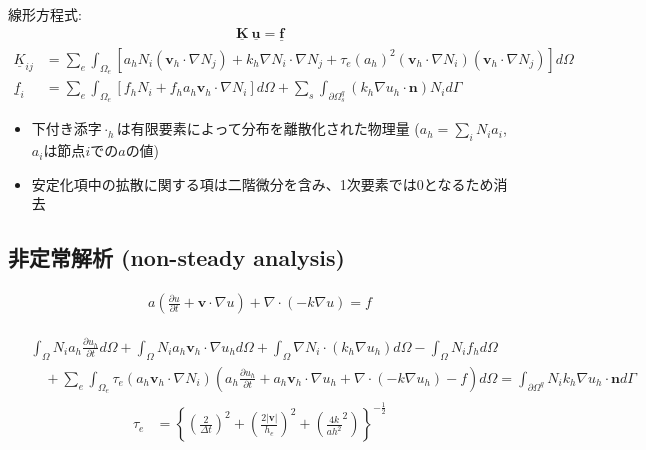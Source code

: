 \documentclass[8pt,a4paper]{article}
\newcommand{\pcl}{\partial}
\newcommand{\bsm}{\boldsymbol}
\newcommand{\udl}{\underline}
\begin{document}
\noindent
線形方程式:
\begin{align}
	\udl{\bsm{K}} \ \udl{\bsm{u}} = \udl{\bsm{f}}
\end{align}
\begin{align}
	\udl{K}_{ij} &= \sum_e \int_{\Omega_e} \left[ a_h N_i \left( \bsm{v}_h \cdot \nabla N_j \right) + k_h \nabla N_i \cdot \nabla N_j + \tau_e (a_h)^2 \left( \bsm{v}_h \cdot \nabla N_i \right) \left( \bsm{v}_h \cdot \nabla N_j \right) \right] d\Omega \\
	\udl{f}_i    &= \sum_e \int_{\Omega_e} \left[ f_h N_i + f_h a_h \bsm{v}_h \cdot \nabla N_i \right] d\Omega + \sum_s \int_{\pcl \Omega^q_s} \left( k_h \nabla u_h  \cdot \bsm{n} \right) N_i d\Gamma 
\end{align}
\begin{itemize}
	\item 下付き添字$\cdot_h$は有限要素によって分布を離散化された物理量 ($a_h = \sum_i N_i a_i$, $a_i$は節点$i$での$a$の値)
	\item 安定化項中の拡散に関する項は二階微分を含み、1次要素では$0$となるため消去
\end{itemize}

\subsection*{非定常解析 (non-steady analysis)}
\begin{align}
	a \left( \frac{\pcl u}{\pcl t} + \bsm{v} \cdot \nabla u \right) + \nabla \cdot \left( -k \nabla u \right) = f
\end{align}

\begin{align}
	\begin{split}
		&\int_{\Omega} N_i a_h \frac{\pcl u_h}{\pcl t} d\Omega + \int_{\Omega} N_i a_h \bsm{v}_h \cdot \nabla u_h d\Omega + \int_{\Omega} \nabla N_i \cdot \left( k_h \nabla u_h \right) d\Omega - \int_{\Omega} N_i f_h d\Omega \\
		&\quad + \sum_e \int_{\Omega_e} \tau_e \left( a_h \bsm{v}_h \cdot \nabla N_i \right) \left( a_h \frac{\pcl u_h}{\pcl t} + a_h \bsm{v}_h \cdot \nabla u_h + \nabla \cdot \left( -k \nabla u_h \right) - f \right) d\Omega = 
		\int_{\pcl \Omega^q} N_i k_h \nabla u_h \cdot \bsm{n} d\Gamma 
	\end{split}
\end{align}
\begin{align}
	\tau_e &= \left\{ \left( \frac{2}{\Delta t} \right)^2 + \left( \frac{2 |\bsm{v}|}{h_e} \right)^2 + \left( \frac{4k}{a h^2}^2 \right) \right\}^{-\frac{1}{2}}
\end{align}
\end{document}
